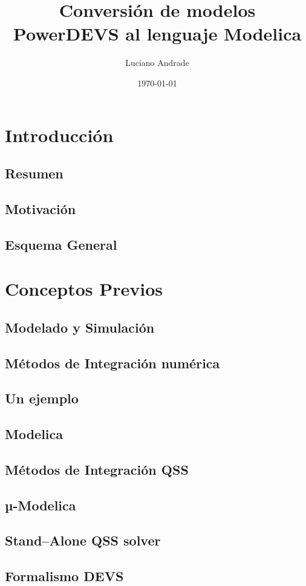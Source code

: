 \documentclass{beamer}
\title{Conversión de modelos PowerDEVS al lenguaje Modelica} %
\author{Luciano Andrade} %
\institute[UNR] %
{
Universidad Nacional de Rosario\\ %
\medskip
\textit{andrade.luciano@gmail.com} %
}
\date{\today} %
\begin{document}
\begin{frame}
\titlepage %
\end{frame}

\section{Introducción}
	\subsection{Resumen}
	\subsection{Motivación}
	\subsection{Esquema General}
\section{Conceptos Previos}
	\subsection{Modelado y Simulación}
	\subsection{Métodos de Integración numérica}
	\subsection{Un ejemplo}
	\subsection{Modelica}
	\subsection{Métodos de Integración QSS}
	\subsection{µ-Modelica}
	\subsection{Stand–Alone QSS solver}
	\subsection{Formalismo DEVS}
\end{document}
